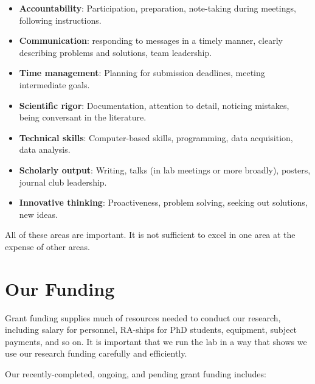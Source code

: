 \documentclass[letterpaper,11pt,oneside]{memoir}
\begin{document}
\begin{itemize}[noitemsep]
\item \textbf{Accountability}: Participation, preparation, note-taking during meetings, following instructions.
\item \textbf{Communication}: responding to messages in a timely manner, clearly describing problems and solutions, team leadership.
\item \textbf{Time management}: Planning for submission deadlines, meeting intermediate goals.
\item \textbf{Scientific rigor}: Documentation, attention to detail, noticing mistakes, being conversant in the literature.
\item \textbf{Technical skills}: Computer-based skills, programming, data acquisition, data analysis.
\item \textbf{Scholarly output}: Writing, talks (in lab meetings or more broadly), posters, journal club leadership.
\item \textbf{Innovative thinking}: Proactiveness, problem solving, seeking out solutions, new ideas.
\end{itemize}

All of these areas are important. It is not sufficient to excel in one area at the expense of other areas.


\section{Our Funding}

Grant funding supplies much of resources needed to conduct our research, including salary for personnel, RA-ships for PhD students, equipment, subject payments, and so on. It is important that we run the lab in a way that shows we use our research funding carefully and efficiently.

Our recently-completed, ongoing, and pending grant funding includes:
\end{document}
